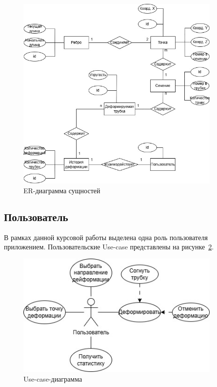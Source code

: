 \begin{figure}[H]
\centering
\includegraphics[width=0.9\textwidth]{img/er_диаграмма.jpg}
\caption{ER-диаграмма сущностей}
\label{fig:er}
\end{figure}

\subsection{Пользователь}

\noindent
\hspace{0.75cm}
В рамках данной курсовой работы выделена одна роль пользователя приложением. Пользовательские Use-case представлены на рисунке~\ref{fig:use-case}.

\begin{figure}[H]
\centering
\includegraphics[width=0.9\textwidth]{img/use-case.jpg}
\caption{Use-case-диаграмма}
\label{fig:use-case}
\end{figure}


